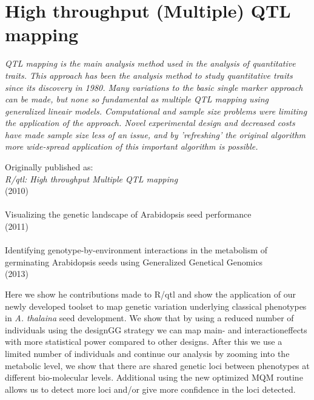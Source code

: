 \chapter{High throughput (Multiple) QTL mapping}
\thispagestyle{empty}
\label{chap:mqm}

\emph{QTL mapping is the main analysis method used in the analysis of quantitative traits. This 
approach has been the analysis method to study quantitative traits since its discovery in 1980. 
Many variations to the basic single marker approach can be made, but none so fundamental as 
multiple QTL mapping using generalized lineair models. Computational and sample size problems 
were limiting the application of the approach. Novel experimental design and decreased costs 
have made sample size less of an issue, and by 'refreshing' the original algorithm more 
wide-spread application of this important algorithm is possible.}
\null
\vfill

\begin{myexampleblock}{Originally published as:}
  \\
  \emph{R/qtl: High throughput Multiple QTL mapping}\\
   (2010) \\

  \\
  Visualizing the genetic landscape of Arabidopsis seed performance\\
   (2011)\\

  \\
  Identifying genotype-by-environment interactions in the metabolism of germinating Arabidopsis seeds using 
  Generalized Genetical Genomics\\
   (2013)
\end{myexampleblock}

\newpage

Here we show he contributions made to R/qtl and show the application of our newly developed toolset 
to map genetic variation underlying classical phenotypes in \emph{A. thalaina} seed development. We 
show that by using a reduced number of individuals using the designGG strategy we can map main- and 
interactioneffects with more statistical power compared to other designs. After this we use a limited 
number of individuals and continue our analysis by zooming into the metabolic level, we show that 
there are shared genetic loci between phenotypes at different bio-molecular levels. Additional using 
the new optimized MQM routine allows us to detect more loci and/or give more confidence in the loci 
detected.

